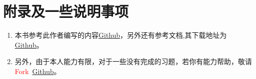 \chapter{附录及一些说明事项}
\centering{\textbf{\textcolor{green}{附录及一些说明事项}}}
\begin{enumerate}
	\item 本书参考此作者编写的内容\href{https://github.com/sikouhjw/Engineering-mathematics-sunflower-treasure-book}{Github}，另外还有参考文档,其下载地址为\href{https://github.com/ElegantLaTeX/ElegantBook}{Github}。
	\item 另外，由于本人能力有限，对于一些没有完成的习题，若你有能力帮助，敬请\textcolor{red}{Fork}\ \href{https://github.com/1411279054/Letax-learning-Note/tree/master/%E6%95%B0%E5%AD%A6%E5%88%86%E6%9E%90%E8%A7%A3%E9%A2%98%E6%8C%87%E5%8D%97%E8%AF%BE%E5%90%8E%E4%B9%A0%E9%A2%98%E9%87%8D%E6%8E%92}{Github}。
\end{enumerate}